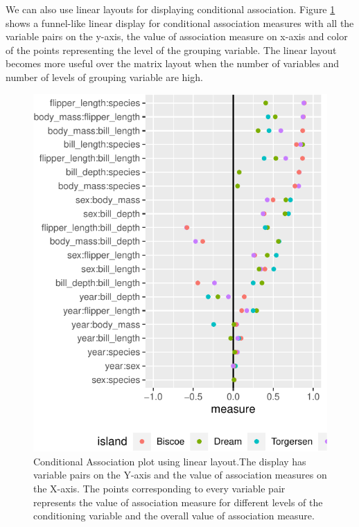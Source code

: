 We can also use linear layouts for displaying conditional association.
Figure \ref{fig:linear-cond-assoc} shows a funnel-like linear display
for conditional association measures with all the variable pairs on the
y-axis, the value of association measure on x-axis and color of the
points representing the level of the grouping variable. The linear
layout becomes more useful over the matrix layout when the number of
variables and number of levels of grouping variable are high.

\begin{Schunk}
\begin{figure}

{\centering \includegraphics{rj_paper_files/figure-latex/linear-cond-assoc-1} 

}

\caption[Conditional Association plot using linear layout.The display has variable pairs on the Y-axis and the value of association measures on the X-axis]{Conditional Association plot using linear layout.The display has variable pairs on the Y-axis and the value of association measures on the X-axis. The points corresponding to every variable pair represents the value of association measure for different levels of the conditioning variable and the overall value of association measure.}\label{fig:linear-cond-assoc}
\end{figure}
\end{Schunk}

